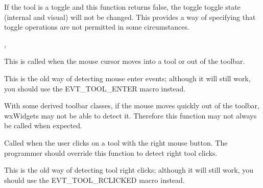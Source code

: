 

If the tool is a toggle and this function returns false, the toggle
toggle state (internal and visual) will not be changed. This provides a way of
specifying that toggle operations are not permitted in some circumstances.


,\rtfsp
{}


\label{wxtoolbaronmouseenter}


This is called when the mouse cursor moves into a tool or out of
the toolbar.

This is the old way of detecting mouse enter events; although it will still work,
you should use the EVT\_TOOL\_ENTER macro instead.




With some derived toolbar classes, if the mouse moves quickly out of the toolbar, wxWidgets may not be able to
detect it. Therefore this function may not always be called when expected.


\label{wxtoolbaronrightclick}


Called when the user clicks on a tool with the right mouse button. The
programmer should override this function to detect right tool clicks.

This is the old way of detecting tool right clicks; although it will still work,
you should use the EVT\_TOOL\_RCLICKED macro instead.



